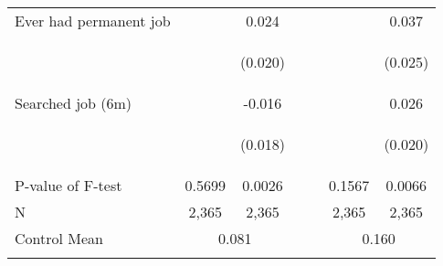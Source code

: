 \begin{tabular}{lcccccc}
\noalign{\smallskip}Ever had permanent job &  & 0.024 &  &  &  & 0.037\\
 & \begin{footnotesize}\end{footnotesize} & \begin{footnotesize}(0.020)\end{footnotesize} & \begin{footnotesize}\end{footnotesize} & \begin{footnotesize}\end{footnotesize} & \begin{footnotesize}\end{footnotesize} & \begin{footnotesize}(0.025)\end{footnotesize}\\
\noalign{\smallskip}Searched job (6m) &  & -0.016 &  &  &  & 0.026\\
 & \begin{footnotesize}\end{footnotesize} & \begin{footnotesize}(0.018)\end{footnotesize} & \begin{footnotesize}\end{footnotesize} & \begin{footnotesize}\end{footnotesize} & \begin{footnotesize}\end{footnotesize} & \begin{footnotesize}(0.020)\end{footnotesize}\\\hline
\noalign{\smallskip}P-value of F-test & 0.5699 & 0.0026 &  & &   0.1567 & 0.0066 \\
\noalign{\smallskip} N  & 2,365 &2,365 &  & &2,365 &2,365 \\
\noalign{\smallskip} Control Mean   & \multicolumn{2}{c}{0.081} & &  &\multicolumn{2}{c}{0.160}  \\
\noalign{\smallskip}\hline\end{tabular}
